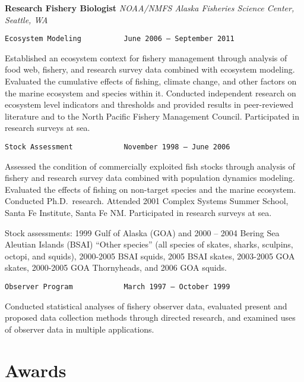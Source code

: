 \documentclass[11pt, a4paper]{awesome-cv}
\begin{document}
\textbf{Research Fishery Biologist} \emph{NOAA/NMFS Alaska Fisheries
Science Center, Seattle, WA}

\begin{verbatim}
Ecosystem Modeling          June 2006 – September 2011
\end{verbatim}

Established an ecosystem context for fishery management through analysis
of food web, fishery, and research survey data combined with ecosystem
modeling. Evaluated the cumulative effects of fishing, climate change,
and other factors on the marine ecosystem and species within it.
Conducted independent research on ecosystem level indicators and
thresholds and provided results in peer-reviewed literature and to the
North Pacific Fishery Management Council. Participated in research
surveys at sea.

\begin{verbatim}
Stock Assessment            November 1998 – June 2006
\end{verbatim}

Assessed the condition of commercially exploited fish stocks through
analysis of fishery and research survey data combined with population
dynamics modeling. Evaluated the effects of fishing on non-target
species and the marine ecosystem. Conducted Ph.D.~research. Attended
2001 Complex Systems Summer School, Santa Fe Institute, Santa Fe NM.
Participated in research surveys at sea.

Stock assessments: 1999 Gulf of Alaska (GOA) and 2000 -- 2004 Bering Sea
Aleutian Islands (BSAI) ``Other species'' (all species of skates,
sharks, sculpins, octopi, and squids), 2000-2005 BSAI squids, 2005 BSAI
skates, 2003-2005 GOA skates, 2000-2005 GOA Thornyheads, and 2006 GOA
squids.

\begin{verbatim}
Observer Program            March 1997 – October 1999
\end{verbatim}

Conducted statistical analyses of fishery observer data, evaluated
present and proposed data collection methods through directed research,
and examined uses of observer data in multiple applications.

\hypertarget{awards}{%
\section{Awards}\label{awards}}
\end{document}
